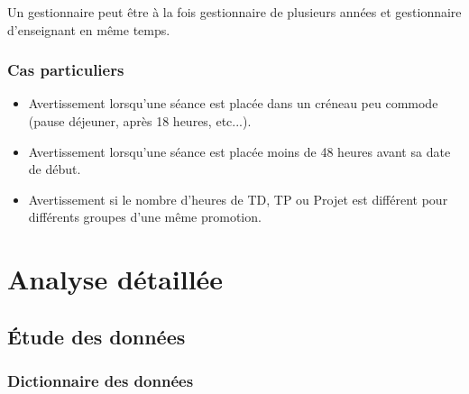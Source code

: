 \documentclass{article}
\begin{document}
Un gestionnaire peut être à la fois gestionnaire de plusieurs années et gestionnaire d'enseignant en même temps.

\subsubsection{Cas particuliers}
\begin{itemize}
\item Avertissement lorsqu'une séance est placée dans un créneau peu commode (pause déjeuner, après 18 heures, etc...).
\item Avertissement lorsqu'une séance est placée moins de 48 heures avant sa date de début.
\item Avertissement si le nombre d'heures de TD, TP ou Projet est différent pour différents groupes d'une même promotion.
\end{itemize}

\section{Analyse détaillée}

\subsection{\'Etude des données}

\subsubsection{Dictionnaire des données}
\end{document}
